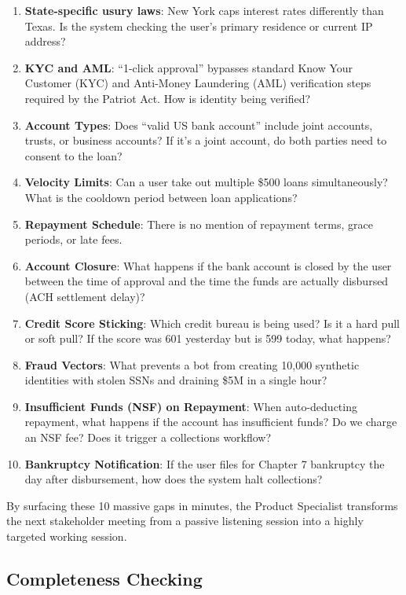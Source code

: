 \begin{enumerate}
\def\labelenumi{\arabic{enumi}.}
\tightlist
\item
  \textbf{State-specific usury laws}: New York caps interest rates
  differently than Texas. Is the system checking the user's primary
  residence or current IP address?
\item
  \textbf{KYC and AML}: ``1-click approval'' bypasses standard Know Your
  Customer (KYC) and Anti-Money Laundering (AML) verification steps
  required by the Patriot Act. How is identity being verified?
\item
  \textbf{Account Types}: Does ``valid US bank account'' include joint
  accounts, trusts, or business accounts? If it's a joint account, do
  both parties need to consent to the loan?
\item
  \textbf{Velocity Limits}: Can a user take out multiple \$500 loans
  simultaneously? What is the cooldown period between loan applications?
\item
  \textbf{Repayment Schedule}: There is no mention of repayment terms,
  grace periods, or late fees.
\item
  \textbf{Account Closure}: What happens if the bank account is closed
  by the user between the time of approval and the time the funds are
  actually disbursed (ACH settlement delay)?
\item
  \textbf{Credit Score Sticking}: Which credit bureau is being used? Is
  it a hard pull or soft pull? If the score was 601 yesterday but is 599
  today, what happens?
\item
  \textbf{Fraud Vectors}: What prevents a bot from creating 10,000
  synthetic identities with stolen SSNs and draining \$5M in a single
  hour?
\item
  \textbf{Insufficient Funds (NSF) on Repayment}: When auto-deducting
  repayment, what happens if the account has insufficient funds? Do we
  charge an NSF fee? Does it trigger a collections workflow?
\item
  \textbf{Bankruptcy Notification}: If the user files for Chapter 7
  bankruptcy the day after disbursement, how does the system halt
  collections?
\end{enumerate}

By surfacing these 10 massive gaps in minutes, the Product Specialist
transforms the next stakeholder meeting from a passive listening session
into a highly targeted working session.

\subsection{Completeness Checking}\label{completeness-checking}

